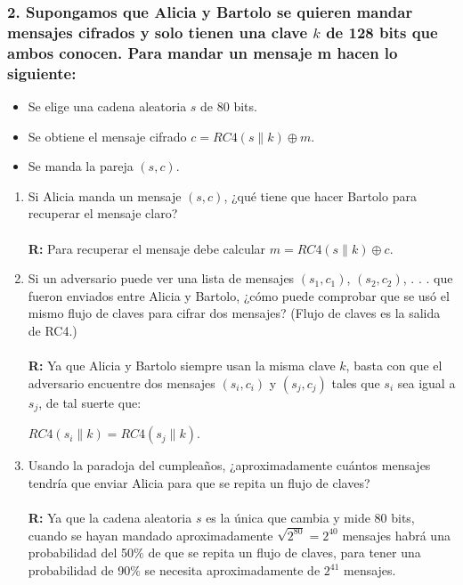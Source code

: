\documentclass[12pt]{article}
\begin{document}
\subsubsection*{2. Supongamos que Alicia y Bartolo se quieren mandar mensajes cifrados y solo tienen una clave $k$ de 128 bits que ambos conocen. Para mandar un mensaje m hacen lo siguiente:}
\begin{itemize}
\item Se elige una cadena aleatoria $s$ de 80 bits.
\item Se obtiene el mensaje cifrado $c = RC4(s \parallel k) \oplus m$.
\item Se manda la pareja $(s, c)$.
\end{itemize}
\begin{enumerate}[label=\alph*)]
\item Si Alicia manda un mensaje $(s, c)$, ¿qué tiene que hacer Bartolo para recuperar el mensaje claro? \\ \\
\textbf{R:} Para recuperar el mensaje debe calcular $m = RC4(s \parallel k) \oplus c$.
  
\item Si un adversario puede ver una lista de mensajes $(s_1, c_1)$, $(s_2, c_2)$, . . . que fueron enviados entre Alicia y Bartolo, ¿cómo puede comprobar que se usó el mismo flujo de claves para cifrar dos mensajes? (Flujo de claves es la salida de RC4.) \\ \\
  \textbf{R:} Ya que Alicia y Bartolo siempre usan la misma clave $k$, basta con que el adversario encuentre dos mensajes $(s_i, c_i)$ y $(s_j, c_j)$ tales que $s_i$ sea igual a $s_j$, de tal suerte que:
  \begin{center} $RC4(s_i \parallel k) = RC4(s_j \parallel k)$.\end{center}
  
\item Usando la paradoja del cumpleaños, ¿aproximadamente cuántos mensajes tendría que enviar Alicia para que se repita un flujo de claves? \\ \\
 \textbf{R:} Ya que la cadena aleatoria $s$ es la única que cambia y mide 80 bits, cuando se hayan mandado aproximadamente $\sqrt{2^{80}} = 2^{40}$ mensajes habrá una probabilidad del 50$\%$ de que se repita un flujo de claves, para tener una probabilidad de 90$\%$ se necesita aproximadamente de $2^{41}$ mensajes.
\end{enumerate}
\end{document}

